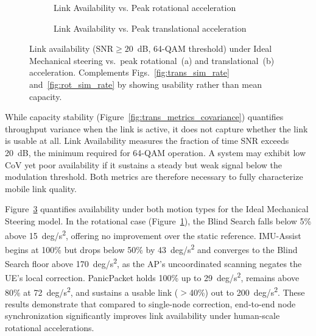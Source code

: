 \documentclass[fleqn,10pt]{wlscirep}
\begin{document}
\begin{figure}[h!]
    \centering
    \begin{subfigure}{0.495\linewidth}
        
        \vspace{-25 pt}
        \caption{Link Availability vs. Peak rotational acceleration}
        \label{fig:rotionalLinkAvail}
    \end{subfigure}
    \hfill
    \begin{subfigure}{0.495\linewidth}
        
        \vspace{-25 pt}
        \caption{Link Availability vs. Peak translational acceleration}
        \label{fig:translationalLinkAvail}
    \end{subfigure}
    \caption{Link availability ($\mathrm{SNR} \geq 20$~dB, 64-QAM threshold) under Ideal Mechanical steering vs.\ peak rotational~(a) and translational~(b) acceleration. Complements Figs.~\ref{fig:trans_sim_rate} and~\ref{fig:rot_sim_rate} by showing usability rather than mean capacity.}
    \label{fig:accelLinkAvail}
\end{figure}

While capacity stability (Figure~\ref{fig:trans_metrics_covariance}) quantifies throughput variance when the link is active, it does not capture whether the link is usable at all. Link Availability measures the fraction of time SNR exceeds \SI{20}{dB}, the minimum required for 64-QAM operation. A system may exhibit low CoV yet poor availability if it sustains a steady but weak signal below the modulation threshold. Both metrics are therefore necessary to fully characterize mobile link quality.

Figure~\ref{fig:accelLinkAvail} quantifies availability under both motion types for the Ideal Mechanical Steering model. In the rotational case (Figure~\ref{fig:rotionalLinkAvail}), the Blind Search falls below 5\% above \SI{15}{deg/s^2}, offering no improvement over the static reference. IMU-Assist begins at 100\% but drops below 50\% by \SI{43}{deg/s^2} and converges to the Blind Search floor above \SI{170}{deg/s^2}, as the AP's uncoordinated scanning negates the UE's local correction. PanicPacket holds 100\% up to \SI{29}{deg/s^2}, remains above 80\% at \SI{72}{deg/s^2}, and sustains a usable link ($>$40\%) out to \SI{200}{deg/s^2}. These results demonstrate that compared to single-node correction, end-to-end node synchronization significantly improves link availability under human-scale rotational accelerations.
\end{document}
